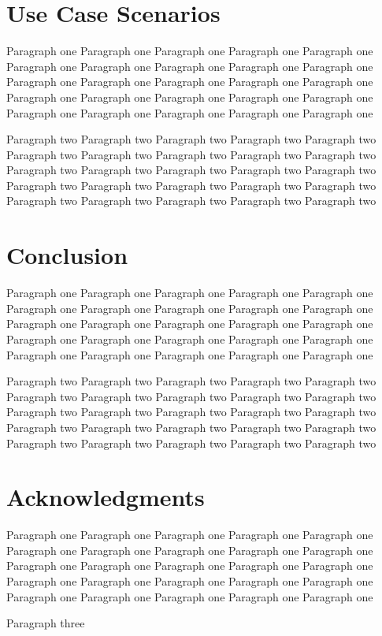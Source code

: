 \documentclass[10pt,journal,final,a4paper,nofonttune]{IEEEtran}
\begin{document}
\section{Use Case Scenarios}
Paragraph one Paragraph one Paragraph one Paragraph one Paragraph one 
Paragraph one Paragraph one Paragraph one Paragraph one Paragraph one 
Paragraph one Paragraph one Paragraph one Paragraph one Paragraph one 
Paragraph one Paragraph one Paragraph one Paragraph one Paragraph one 
Paragraph one Paragraph one Paragraph one Paragraph one Paragraph one 

Paragraph two Paragraph two Paragraph two Paragraph two Paragraph two 
Paragraph two Paragraph two Paragraph two Paragraph two Paragraph two 
Paragraph two Paragraph two Paragraph two Paragraph two Paragraph two 
Paragraph two Paragraph two Paragraph two Paragraph two Paragraph two 
Paragraph two Paragraph two Paragraph two Paragraph two Paragraph two 

\section{Conclusion}

Paragraph one Paragraph one Paragraph one Paragraph one Paragraph one 
Paragraph one Paragraph one Paragraph one Paragraph one Paragraph one 
Paragraph one Paragraph one Paragraph one Paragraph one Paragraph one 
Paragraph one Paragraph one Paragraph one Paragraph one Paragraph one 
Paragraph one Paragraph one Paragraph one Paragraph one Paragraph one 

Paragraph two Paragraph two Paragraph two Paragraph two Paragraph two 
Paragraph two Paragraph two Paragraph two Paragraph two Paragraph two 
Paragraph two Paragraph two Paragraph two Paragraph two Paragraph two 
Paragraph two Paragraph two Paragraph two Paragraph two Paragraph two 
Paragraph two Paragraph two Paragraph two Paragraph two Paragraph two 

\section*{Acknowledgments}

Paragraph one Paragraph one Paragraph one Paragraph one Paragraph one 
Paragraph one Paragraph one Paragraph one Paragraph one Paragraph one 
Paragraph one Paragraph one Paragraph one Paragraph one Paragraph one 
Paragraph one Paragraph one Paragraph one Paragraph one Paragraph one 
Paragraph one Paragraph one Paragraph one Paragraph one Paragraph one 

Paragraph three



\end{document}
